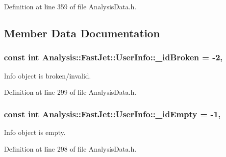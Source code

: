 Definition at line 359 of file Analysis\+Data.\+h.



\subsection{Member Data Documentation}
\subsubsection[{\texorpdfstring{\+\_\+id\+Broken}{_idBroken}}]{\setlength{\rightskip}{0pt plus 5cm}const int Analysis\+::\+Fast\+Jet\+::\+User\+Info\+::\+\_\+id\+Broken = -\/2\hspace{0.3cm}{\ttfamily [static]}, {\ttfamily [private]}}\hypertarget{classAnalysis_1_1FastJet_1_1UserInfo_aadf5fa5d0ecc73ef4eacf06657cda88c}{}\label{classAnalysis_1_1FastJet_1_1UserInfo_aadf5fa5d0ecc73ef4eacf06657cda88c}


Info object is broken/invalid. 



Definition at line 299 of file Analysis\+Data.\+h.

\subsubsection[{\texorpdfstring{\+\_\+id\+Empty}{_idEmpty}}]{\setlength{\rightskip}{0pt plus 5cm}const int Analysis\+::\+Fast\+Jet\+::\+User\+Info\+::\+\_\+id\+Empty = -\/1\hspace{0.3cm}{\ttfamily [static]}, {\ttfamily [private]}}\hypertarget{classAnalysis_1_1FastJet_1_1UserInfo_a48e0b4a7c3bd0c598334865c7772f3d7}{}\label{classAnalysis_1_1FastJet_1_1UserInfo_a48e0b4a7c3bd0c598334865c7772f3d7}


Info object is empty. 



Definition at line 298 of file Analysis\+Data.\+h.

